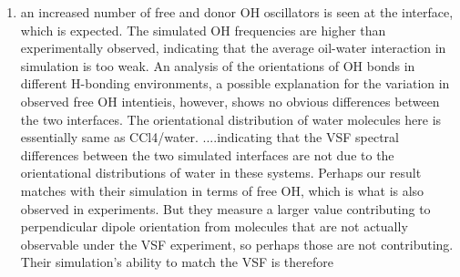 \documentclass[12pt,reqno]{amsart}
\numberwithin{equation}{section}
\begin{document}
\begin{enumerate}
\item an increased number of free and donor OH oscillators is seen at the interface, which is expected.  The simulated OH frequencies are higher than experimentally observed, indicating that the average oil-water interaction in simulation is too weak.  An analysis of the orientations of OH bonds in different H-bonding environments, a possible explanation for the variation in observed free OH intentieis, however, shows no obvious differences between the two interfaces.  The orientational distribution of water molecules here is essentially same as CCl4/water.  ....indicating that the VSF spectral differences between the two simulated interfaces are not due to the orientational distributions of water in these systems.  Perhaps our result matches with their simulation in terms of free OH, which is what is also observed in experiments.  But they measure a larger value contributing to perpendicular dipole orientation from molecules that are not actually observable under the VSF experiment, so perhaps those are not contributing.  Their simulation's ability to match the VSF is therefore 

\end{enumerate}
\end{document}
